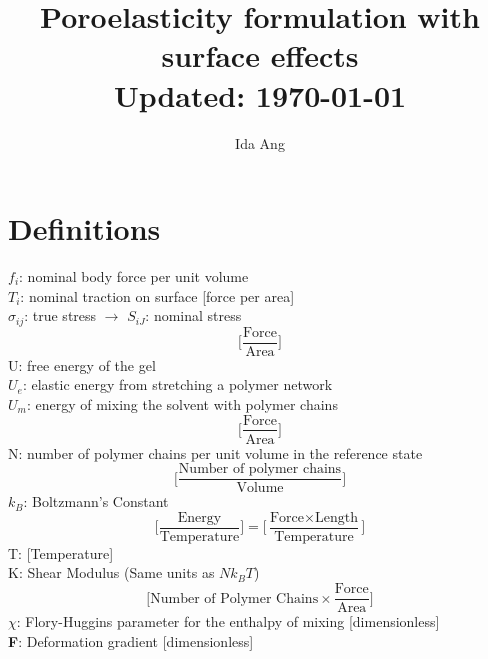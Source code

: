 \documentclass[12pt,3p]{article}
\numberwithin{equation}{section}
\begin{document}
\title{Poroelasticity formulation with surface effects \\
	\Large{Updated: \today} \vspace{-2ex}}
\author{Ida Ang}
\date{\vspace{-5ex}}
\maketitle

\tableofcontents
\newpage

\section{Definitions}
\vspace{-2ex}

$f_i$: nominal body force per unit volume \\
$T_i$: nominal traction on surface [force per area] \\
$\sigma_{ij}$: true stress $\rightarrow$ $S_{iJ}$: nominal stress 
\begin{equation*}
\bigg[ \frac{\text{Force}}{\text{Area}} \bigg] 
\end{equation*}
U: free energy of the gel \\
	\indent 
	$U_e$: elastic energy from stretching a polymer network \\
	\indent
	$U_m$: energy of mixing the solvent with polymer chains
\begin{equation*}
\bigg[ \frac{\text{Force}}{\text{Area}} \bigg] 
\end{equation*}
N: number of polymer chains per unit volume in the reference state 
\begin{equation*}
\bigg[ \frac{\text{Number of polymer chains}}{\text{Volume}} \bigg]
\end{equation*}
$k_B$: Boltzmann's Constant
\begin{equation*}
\bigg[ \frac{\text{Energy}}{\text{Temperature}} \bigg] = \bigg[ \frac{\text{Force} \times \text{Length}}{\text{Temperature}} \bigg] 
\end{equation*}
T: [Temperature] \\
K: Shear Modulus (Same units as $N k_B T$)
\begin{equation*}
\bigg[\text{Number of Polymer Chains} \times \frac{\text{Force}}{\text{Area}} \bigg] 
\end{equation*}
$\chi$: Flory-Huggins parameter for the enthalpy of mixing [dimensionless] \\
\textbf{F}: Deformation gradient [dimensionless] \\
\end{document}
